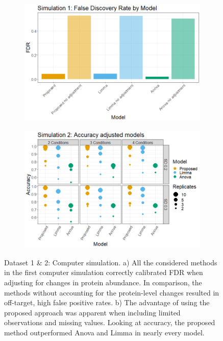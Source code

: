 \documentclass[mcp]{article}
\numberwithin{table}{section}
\begin{document}
\begin{figure}[ht]
\centering
\begin{subfigure}[c]{0.825\linewidth}
\includegraphics[width=1\textwidth]{images/sim1_FDR_all_models.png}
\caption{}
\label{fig:sim1_fdr}
\end{subfigure}
\begin{subfigure}[c]{0.825\linewidth}
\includegraphics[width=1\textwidth]{images/sim3_Accuracy.png}
\caption{}
\label{fig:sim2_acc}
\end{subfigure}
\caption{Dataset 1 \& 2: Computer simulation. a) All the considered methods in the first computer simulation correctly calibrated FDR when adjusting for changes in protein abundance. In comparison, the methods without accounting for the protein-level changes resulted in off-target, high false positive rates. b) The advantage of using the proposed approach was apparent when including limited observations and missing values. Looking at accuracy, the proposed method outperformed Anova and Limma in nearly every model.
}
\label{fig:computer_sim}
\end{figure}
\end{document}
